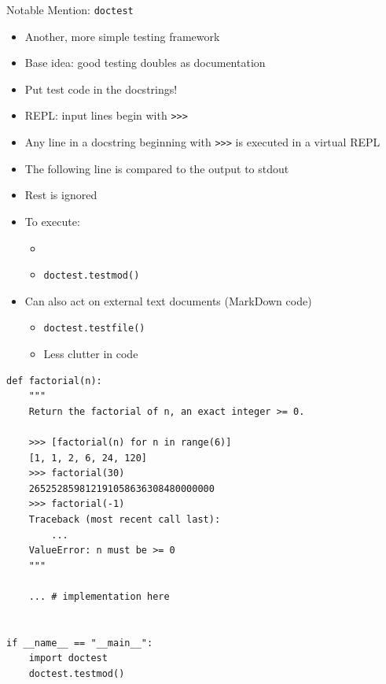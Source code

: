 
\begin{frame}{Notable Mention: \texttt{doctest}}
%
\begin{itemize}
\item Another, more simple testing framework
\item Base idea: good testing doubles as documentation
\item[\Thus] Put test code in the docstrings!
\pause
\item REPL: input lines begin with \texttt{>{}>{}>}
\item Any line in a docstring beginning with \texttt{>{}>{}>} is executed in a virtual REPL
\item The following line is compared to the output to stdout
\item Rest is ignored
\pause
\item To execute:
	\begin{itemize}
	\item {}
	\item \texttt{doctest.testmod()}
	\end{itemize}
\pause
\item Can also act on external text documents (\zB MarkDown code)
	\begin{itemize}
	\item \texttt{doctest.testfile()}
	\item Less clutter in code
	\end{itemize}
\end{itemize}
%
\end{frame}


\begin{frame}[fragile]
%
\vspace{-6pt}
\begin{codebox}[DocTest.py]
\begin{verbatim}
def factorial(n):
    """
    Return the factorial of n, an exact integer >= 0.

    >>> [factorial(n) for n in range(6)]
    [1, 1, 2, 6, 24, 120]
    >>> factorial(30)
    265252859812191058636308480000000
    >>> factorial(-1)
    Traceback (most recent call last):
        ...
    ValueError: n must be >= 0
    """
    
    ... # implementation here


if __name__ == "__main__":
    import doctest
    doctest.testmod()
\end{verbatim}
\end{codebox}
%
\end{frame}

